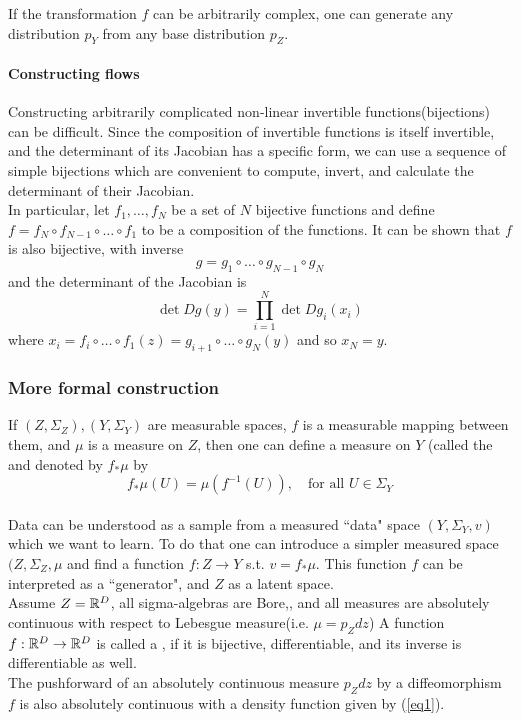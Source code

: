\documentclass[11pt]{article}
\begin{document}
\fact
If the transformation $f$ can be arbitrarily complex, one can generate any distribution $p_Y$ from any base distribution $p_Z$.

\paragraph{Constructing flows}
Constructing arbitrarily complicated non-linear invertible functions(bijections) can be difficult. Since the composition of invertible functions is itself invertible, and the determinant of its Jacobian has a specific form, we can use a sequence of simple bijections which are convenient to compute, invert, and calculate the determinant of their Jacobian.\\
In particular, let $f_1, \hdots, f_N$ be a set of $N$ bijective functions and define 
$f = f_N \circ f_{N-1} \circ \hdots \circ f_1$ to be a composition of the functions. It can be shown that $f$ is also bijective, with inverse 
$$g = g_1 \circ \hdots \circ g_{N-1} \circ g_N$$
and the determinant of the Jacobian is
$$\det Dg(y) = \prod_{i=1}^N \det Dg_i(x_i)$$
where $x_i = f_i \circ \hdots \circ f_1(z) = g_{i+1} \circ \hdots \circ g_N(y)$ and so $x_N = y$.

\subsubsection{More formal construction}
 If $(Z, \Sigma_Z), (Y, \Sigma_Y)$ are measurable spaces, $f$ is a measurable mapping between them, and $\mu$ is a measure on $Z$, then one can define a measure on $Y$ (called the  and denoted by $f_{\ast}\mu$ by
$$f_{\ast}\mu(U) = \mu(f^{-1}(U)), \quad \text{for all } U \in \Sigma_Y$$\\
Data can be understood as a sample from a measured ``data" space $(Y, \Sigma_Y, v)$ which we want to learn. To do that one can introduce a simpler measured space $(Z, \Sigma_Z, \mu$ and find a function $f: Z \rightarrow Y$ s.t. $v = f_{\ast}\mu$. This function $f$ can be interpreted as a ``generator", and $Z$ as a latent space.\\
Assume $Z = \mathbb{R}^D$, all sigma-algebras are Bore,, and all measures are absolutely continuous with respect to Lebesgue measure(i.e. $\mu = p_Zdz$)
 A function $f: \mathbb{R}^D \rightarrow \mathbb{R}^D$ is called a , if it is bijective, differentiable, and its inverse is differentiable as well.\\
The pushforward of an absolutely continuous measure $p_Zdz$ by a diffeomorphism $f$ is also absolutely continuous with a density function given by (\ref{eq1}).
\end{document}
